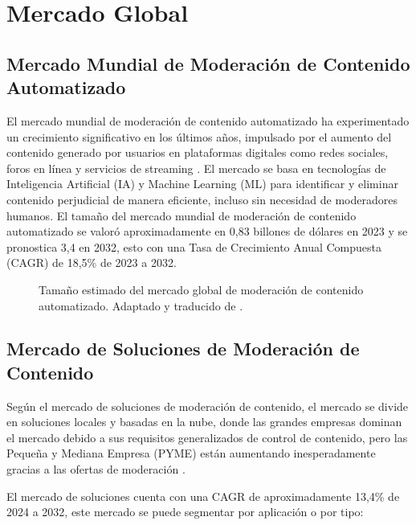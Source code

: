 \vspace{0.5cm}

\section{Mercado Global}

\subsection{Mercado Mundial de Moderación de Contenido Automatizado}

El mercado mundial de moderación de contenido automatizado ha experimentado un crecimiento significativo en los últimos años, impulsado por el aumento del contenido generado por usuarios en plataformas digitales como redes sociales, foros en línea y servicios de streaming \cite{bri2024automated}. El mercado se basa en tecnologías de Inteligencia Artificial (IA) y Machine Learning (ML) para identificar y eliminar contenido perjudicial de manera eficiente, incluso sin necesidad de moderadores humanos. El tamaño del mercado mundial de moderación de contenido automatizado se valoró aproximadamente en 0,83 billones de dólares en 2023 y se pronostica 3,4 en 2032, esto con una Tasa de Crecimiento Anual Compuesta (CAGR) de 18,5\% de 2023 a 2032.

\begin{figure}[h!]
    \centering
    \caption{Tamaño estimado del mercado global de moderación de contenido automatizado. Adaptado y traducido de \cite{bri2024automated}.}
\end{figure}

\subsection{Mercado de Soluciones de Moderación de Contenido}

Según el mercado de soluciones de moderación de contenido, el mercado se divide en soluciones locales y basadas en la nube, donde las grandes empresas dominan el mercado debido a sus requisitos generalizados de control de contenido, pero las Pequeña y Mediana Empresa (PYME) están aumentando inesperadamente gracias a las ofertas de moderación \cite{bri2024solutions}.

El mercado de soluciones cuenta con una CAGR de aproximadamente 13,4\% de 2024 a 2032, este mercado se puede segmentar por aplicación o por tipo:



